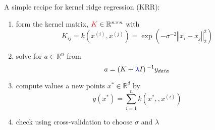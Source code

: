 A simple recipe for {\color{red}kernel} {\color{blue}ridge} regression (KRR):\\
\begin{enumerate}
	\pause{}
	\item form the kernel matrix, $\color{red}K\color{black}\in\mathbb{R}^{n\times n}$ with \[K_{ij}=k(x^{(i)},x^{(j)})= \exp\left(-\sigma^{-2}\left\Vert x_i-x_j \right\Vert_2^2 \right)\]	\pause{}
	\item solve for $a\in\mathbb{R}^{n}$ from \[a=\left(K + \color{blue}\lambda\color{black} I\right)^{-1}y_{data}\]	\pause{}
	\item compute values a new points $x^{*}\in \mathbb{R}^{d}$ by\[ y(x^{*})=\sum_{i=1}^{n}k(x^{*},,x^{(i)})\]	\pause{}
	\item check using cross-validation to choose $\sigma$ and $\lambda$
\end{enumerate}